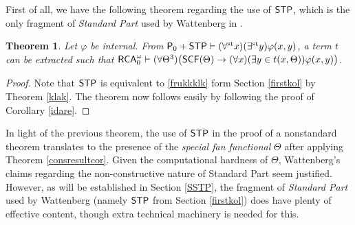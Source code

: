 \documentclass[reqno]{amsart}
\newtheorem{thm}{Theorem}
\def\STP{\textup{\textsf{STP}}}
\def\RCAo{\textup{\textsf{RCA}}_{0}^{\omega}}
\def\P{\textup{\textsf{P}}}
\def\st{\textup{st}}
\def\di{\rightarrow}
\def\SCF{\textup{\textsf{SCF}}}
\numberwithin{equation}{section}
\numberwithin{thm}{section}
\begin{document}
First of all, we have the following theorem regarding the use of $\STP$, which is the only fragment of \emph{Standard Part} used by Wattenberg in \cite{watje}.  
\begin{thm}\label{daradal} Let $\varphi$ be internal.
From $\P_{0}+ \STP\vdash (\forall^{\st}x)(\exists^{\st}y)\varphi(x, y)$, a term $t$ can be extracted such that $\RCAo\vdash (\forall \Theta^{3})\big(\SCF(\Theta)\di  (\forall x)(\exists y\in t(x, \Theta))\varphi(x, y)  \big)$.
\end{thm}
\begin{proof}
Note that $\STP$ is equivalent to \eqref{frukkklk} form Section \ref{firstkol} by Theorem \ref{klak}.  The theorem now follows easily by following the proof of Corollary \ref{idare}.    
\end{proof}
In light of the previous theorem, the use of $\STP$ in the proof of a nonstandard theorem translates to the presence of the \emph{special fan functional} $\Theta$ after applying Theorem \ref{consresultcor}.  
Given the computational hardness of $\Theta$, Wattenberg's claims regarding the non-constructive nature of Standard Part seem justified.  
However, as will be established in Section \ref{SSTP}, the fragment of \emph{Standard Part} used by Wattenberg (namely $\STP$ from Section \ref{firstkol}) does have plenty 
of effective content, though extra technical machinery is needed for this.  

\medskip
\end{document}
